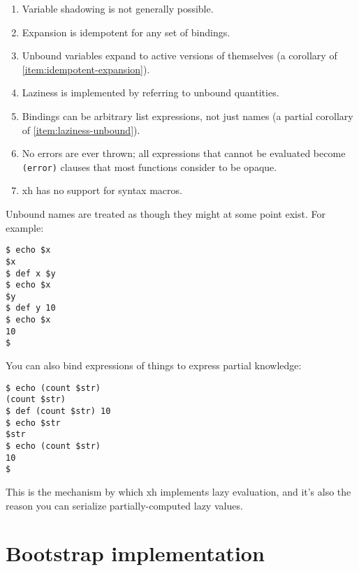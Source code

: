 \documentclass{report}
\begin{document}
\begin{enumerate}
\item{Variable shadowing is not generally possible.}
       \label{item:no-variable-shadowing}
\item{Expansion is idempotent for any set of bindings.}
       \label{item:idempotent-expansion}
\item{Unbound variables expand to active versions of themselves (a}
       corollary of \ref{item:idempotent-expansion}).
       \label{item:unbound-expansion}
\item{Laziness is implemented by referring to unbound quantities.}
       \label{item:laziness-unbound}
\item{Bindings can be arbitrary list expressions, not just names (a}
       partial corollary of \ref{item:laziness-unbound}).
       \label{item:arbitrary-bindings}
\item{No errors are ever thrown; all expressions that cannot be evaluated}
       become \verb|(error)| clauses that most functions consider to be
       opaque.
       \label{item:no-errors}
\item{xh has no support for syntax macros.}
       \label{item:no-macros}
\end{enumerate}

  Unbound names are treated as though they might at some point exist. For
  example:

\begin{verbatim}
$ echo $x
$x
$ def x $y
$ echo $x
$y
$ def y 10
$ echo $x
10
$
\end{verbatim}

  You can also bind expressions of things to express partial knowledge:

\begin{verbatim}
$ echo (count $str)
(count $str)
$ def (count $str) 10
$ echo $str
$str
$ echo (count $str)
10
$
\end{verbatim}

  This is the mechanism by which xh implements lazy evaluation, and it's also
  the reason you can serialize partially-computed lazy values.

\part{Bootstrap implementation}\label{part:bootstrap-implementation}
\end{document}
